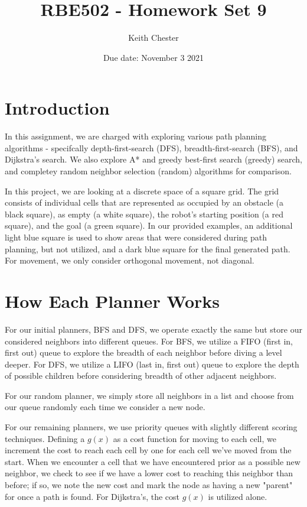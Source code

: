 \documentclass{article}
\title{RBE502 - Homework Set 9}
\author{Keith Chester}
\date{Due date: November 3 2021}
\begin{document}
\maketitle

\section*{Introduction}
In this assignment, we are charged with exploring various path planning algorithms - specifcally depth-first-search (DFS), breadth-first-search (BFS), and Dijkstra's search. We also explore A* and greedy best-first search (greedy) search, and completey random neighbor selection (random) algorithms for comparison.

In this project, we are looking at a discrete space of a square grid. The grid consists of individual cells that are represented as occupied by an obstacle (a black square), as empty (a white square), the robot's starting position (a red square), and the goal (a green square). In our provided examples, an additional light blue square is used to show areas that were considered during path planning, but not utilized, and a dark blue square for the final generated path. For movement, we only consider orthogonal movement, not diagonal.

\section*{How Each Planner Works}
For our initial planners, BFS and DFS, we operate exactly the same but store our considered neighbors into different queues. For BFS, we utilize a FIFO (first in, first out) queue to explore the breadth of each neighbor before diving a level deeper. For DFS, we utilize a LIFO (last in, first out) queue to explore the depth of possible children before considering breadth of other adjacent neighbors.

For our random planner, we simply store all neighbors in a list and choose from our queue randomly each time we consider a new node.

For our remaining planners, we use priority queues with slightly different scoring techniques. Defining a $g(x)$ as a cost function for moving to each cell, we increment the cost to reach each cell by one for each cell we've moved from the start. When we encounter a cell that we have encountered prior as a possible new neighbor, we check to see if we have a lower cost to reaching this neighbor than before; if so, we note the new cost and mark the node as having a new "parent" for once a path is found. For Dijkstra's, the cost $g(x)$ is utilized alone.
\end{document}
